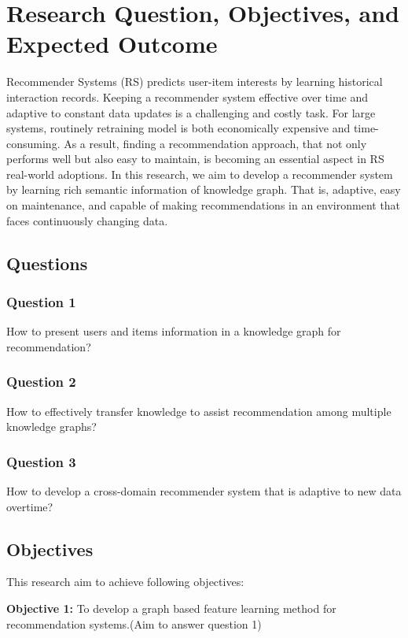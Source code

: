 
\section{Research Question, Objectives, and Expected Outcome}

Recommender Systems (RS) predicts user-item interests by learning historical interaction records. Keeping a recommender system effective over time and adaptive to constant data updates is a challenging and costly task. For large systems, routinely retraining model is both economically expensive and time-consuming. As a result, finding a recommendation approach, that not only performs well but also easy to maintain, is becoming an essential aspect in RS real-world adoptions.
In this research, we aim to develop a recommender system by learning rich semantic information of knowledge graph. That is, adaptive, easy on maintenance, and capable of making recommendations in an environment that faces continuously changing data. 

\subsection{Questions}

\subsubsection*{Question 1}
How to present users and items information in a knowledge graph for recommendation?

\subsubsection*{Question 2}
How to effectively transfer knowledge to assist recommendation among multiple knowledge graphs?

\subsubsection*{Question 3}
How to develop a cross-domain recommender system that is adaptive to new data overtime?

\subsection{Objectives}
This research aim to achieve following objectives: 

\bigskip
\textbf{Objective 1:} To develop a graph based feature learning method for recommendation systems.(Aim to answer question 1)


